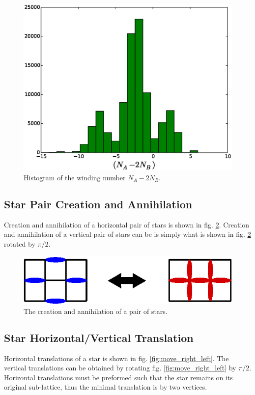 \documentclass[aps,floatfix,11pt]{revtex4-1}
\begin{document}
\begin{figure}[h]
    \centering
    \includegraphics[width=8.5 cm]{W_vrt_NAm2NB_str_dmr_mdl}
    \caption{Histogram of the winding number $N_A - 2N_B$.\label{}}
\end{figure}

\clearpage
\subsection{Star Pair Creation and Annihilation}

Creation and annihilation of a horizontal pair of stars is shown in fig.
\ref{fig:create_annihilate_pair}. Creation and annihilation of a vertical pair of stars can be
is simply what is shown in fig. \ref{fig:create_annihilate_pair} rotated by $\pi/2$.

\begin{figure}[h]
    \centering
    \includegraphics[width=8.5 cm]{create_annihilate_pair}
    \caption{The creation and annihilation of a pair of stars.
\label{fig:create_annihilate_pair}}
\end{figure}

\subsection{Star Horizontal/Vertical Translation}
Horizontal translations of a star is shown in fig. \ref{fig:move_right_left}. The vertical
translations can be obtained by rotating fig. \ref{fig:move_right_left} by $\pi/2$. Horizontal
translations must be preformed such that the star remains on its original sub-lattice, thus the
minimal translation is by two vertices.
\end{document}
